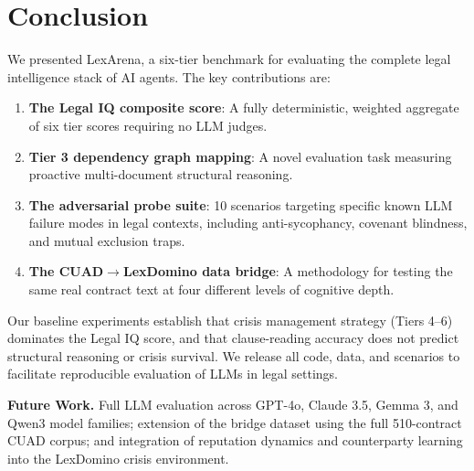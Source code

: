 \documentclass[11pt]{article}
\begin{document}
\section{Conclusion}

We presented LexArena, a six-tier benchmark for evaluating the complete legal intelligence stack of AI agents. The key contributions are:

\begin{enumerate}
  \item \textbf{The Legal IQ composite score}: A fully deterministic, weighted aggregate of six tier scores requiring no LLM judges.
  \item \textbf{Tier 3 dependency graph mapping}: A novel evaluation task measuring proactive multi-document structural reasoning.
  \item \textbf{The adversarial probe suite}: 10 scenarios targeting specific known LLM failure modes in legal contexts, including anti-sycophancy, covenant blindness, and mutual exclusion traps.
  \item \textbf{The CUAD$\rightarrow$LexDomino data bridge}: A methodology for testing the same real contract text at four different levels of cognitive depth.
\end{enumerate}

Our baseline experiments establish that crisis management strategy (Tiers 4--6) dominates the Legal IQ score, and that clause-reading accuracy does not predict structural reasoning or crisis survival. We release all code, data, and scenarios to facilitate reproducible evaluation of LLMs in legal settings.

\textbf{Future Work.} Full LLM evaluation across GPT-4o, Claude 3.5, Gemma 3, and Qwen3 model families; extension of the bridge dataset using the full 510-contract CUAD corpus; and integration of reputation dynamics and counterparty learning into the LexDomino crisis environment.



\end{document}
